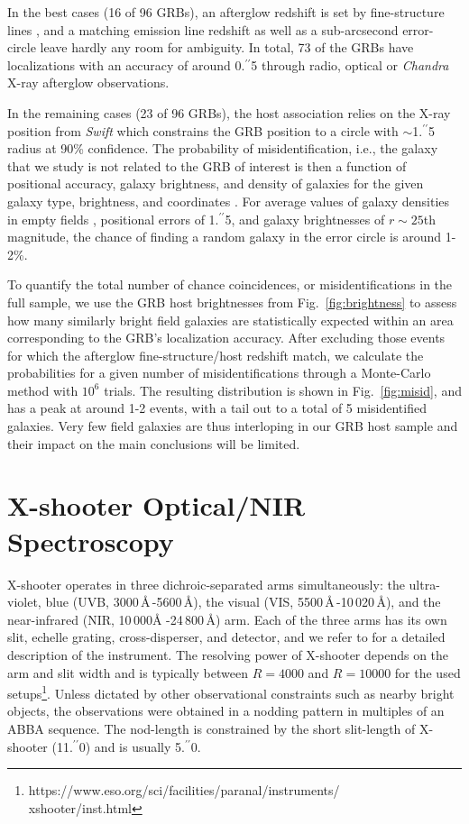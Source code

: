 \documentclass[traditabstract, longauth]{aa}
\newcommand{\farc}{\hbox{$.\!\!^{\prime\prime}$}}
\begin{document}
In the best cases  {(16 of 96 GRBs)}, an afterglow redshift is set by fine-structure lines \citep[e.g.,][]{2007A&A...468...83V}, and a matching emission line redshift as well as a sub-arcsecond error-circle leave hardly any room for ambiguity.  {In total, 73 of the GRBs have localizations with an accuracy of around 0\farc{5} through radio, optical or \textit{Chandra} X-ray afterglow observations.}

In the remaining cases  {(23 of 96 GRBs)}, the host association relies on the X-ray position from \textit{Swift} which constrains the GRB position to a circle with $\sim$1\farc{5} radius at 90\% confidence. The probability of misidentification, i.e., the galaxy that we study is not related to the GRB of interest is then a function of positional accuracy, galaxy brightness, and density of galaxies for the given galaxy type, brightness, and coordinates \citep[e.g.,][]{2014A&A...572A..47R}. For average values of galaxy densities in empty fields \citep{2004AJ....127..180C, 2006ApJS..162....1G}, positional errors of 1\farc{5}, and galaxy brightnesses of $r\sim25$th magnitude, the chance of finding a random galaxy in the error circle is around 1-2\%. 

To quantify the total number of chance coincidences, or misidentifications in the full sample,  {we use the GRB host brightnesses from Fig.~\ref{fig:brightness} to assess how many similarly bright field galaxies \citep{2004AJ....127..180C, 2006ApJS..162....1G} are statistically expected within an area corresponding to the GRB's localization accuracy. After excluding those events for which the afterglow fine-structure/host redshift match, we calculate the probabilities for a given number of misidentifications through a Monte-Carlo method with $10^{6}$ trials. The resulting distribution is shown in Fig.~\ref{fig:misid}, and has a peak at around 1-2 events, with a tail out to a total of 5 misidentified galaxies. Very few field galaxies are thus interloping in our GRB host sample and their impact on the main conclusions will be limited.}

\section{X-shooter Optical/NIR Spectroscopy}
\label{xs}

X-shooter operates in three dichroic-separated arms simultaneously: the ultra-violet, blue (UVB, 3000\,\AA\,-5600\,\AA), the visual (VIS, 5500\,\AA\,-10\,020\,\AA), and the near-infrared (NIR, 10\,000\AA\,\,-24\,800\,\AA) arm. Each of the three arms has its own slit, echelle grating, cross-disperser, and detector, and we refer to \citet{2011A&A...536A.105V} for a detailed description of the instrument. The resolving power of X-shooter depends on the arm and slit width and is typically between $R=4000$ and $R=10000$ for the used setups\footnote{https://www.eso.org/sci/facilities/paranal/instruments/\\xshooter/inst.html}. Unless dictated by other observational constraints such as nearby bright objects, the observations were obtained in a nodding pattern in multiples of an ABBA sequence. The nod-length is constrained by the short slit-length of X-shooter (11\farc{0}) and is usually 5\farc{0}. 
\end{document}
